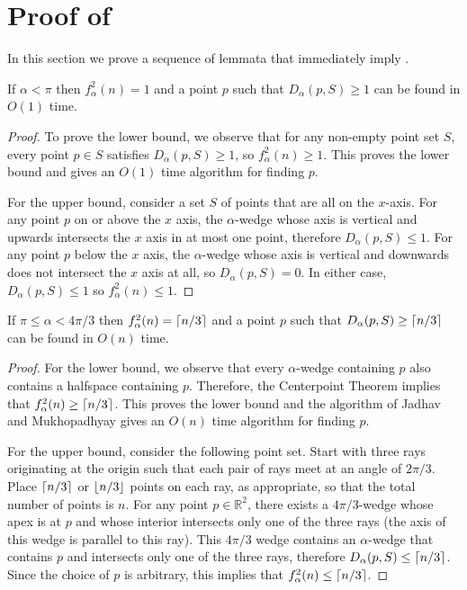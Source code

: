 \documentclass[lotsofwhite]{patmorin}
\newcommand{\R}{\mathbb{R}}
\begin{document}
\section{Proof of }

In this section we prove a sequence of lemmata that immediately imply
.

\begin{lem}
If $\alpha < \pi$ then $f^2_\alpha(n) = 1$ and a point $p$ such that
$D_\alpha(p,S)\ge 1$ can be found in $O(1)$ time.
\end{lem}

\begin{proof}
To prove the lower bound, we observe that for any non-empty
point set $S$, every point $p\in S$ satisfies $D_\alpha(p,S)\ge 1$, so
$f^2_\alpha(n) \ge 1$. This proves the lower bound and gives an $O(1)$
time algorithm for finding $p$. 

For the upper bound, consider a set $S$ of points that are all
on the $x$-axis.  For any point $p$ on or above the $x$ axis, the
$\alpha$-wedge whose axis is vertical and upwards intersects the $x$
axis in at most one point, therefore $D_\alpha(p,S) \le 1$.  For any
point $p$ below the $x$ axis, the $\alpha$-wedge whose axis is
vertical and downwards does not intersect the $x$ axis at all, so
$D_\alpha(p,S)=0$.  In either case, $D_\alpha(p,S)\le 1$ so $f^2_\alpha(n)
\le 1$.
\end{proof}

\begin{lem}
If $\pi\le \alpha < 4\pi/3$ then $f^2_\alpha(n) = \left\lceil n/3 \right\rceil$ and a
point $p$ such that $D_\alpha(p,S)\ge \left\lceil n/3 \right\rceil$ can be found in $O(n)$ time.
\end{lem}

\begin{proof} 
For the lower bound, we observe that every $\alpha$-wedge containing
$p$ also contains a halfspace containing $p$.  Therefore, the
Centerpoint Theorem implies that $f^2_\alpha(n) \ge \left\lceil n/3 \right\rceil$.  This
proves the lower bound and the algorithm of Jadhav and Mukhopadhyay
\cite{jm94} gives an $O(n)$ time algorithm for finding $p$.

For the upper bound, consider the following point set.  Start with
three rays originating at the origin such that each pair of rays meet at an
angle of $2\pi/3$.  Place $\left\lceil n/3 \right\rceil$ or $\left\lfloor n/3 \right\rfloor$ points on each
ray, as appropriate, so that the total number of points is $n$.  For
any point $p\in\R^2$, there exists a $4\pi/3$-wedge whose apex
is at $p$ and whose interior intersects only one of the three rays
(the axis of this wedge is parallel to this ray). This $4\pi/3$ wedge
contains an $\alpha$-wedge that contains $p$ and intersects only one
of the three rays, therefore $D_\alpha(p,S)\le \left\lceil n/3 \right\rceil$.  Since the
choice of $p$ is arbitrary, this implies that $f^2_\alpha(n) \le
\left\lceil n/3 \right\rceil$.  
\end{proof}
\end{document}
